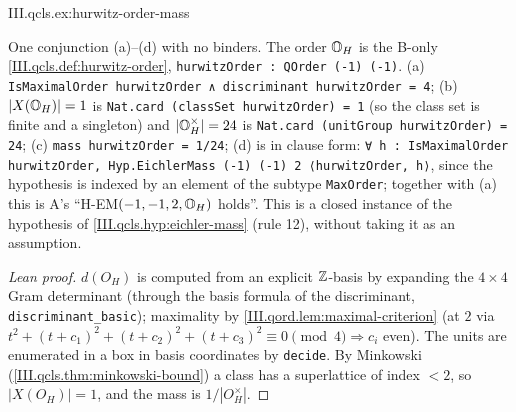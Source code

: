 \begin{example}
\end{example}
\begin{tfformal}{III.qcls.ex:hurwitz-order-mass}
\begin{tffidelity}
One conjunction (a)--(d) with no binders. The order $\mathbb{O}_H$ is the B-only \cref{III.qcls.def:hurwitz-order}, \texttt{hurwitzOrder : QOrder (-1) (-1)}. (a) \texttt{IsMaximalOrder hurwitzOrder ∧ discriminant hurwitzOrder = 4}; (b) $\lvert X(\mathbb{O}_H)\rvert=1$ is \texttt{Nat.card (classSet hurwitzOrder) = 1} (so the class set is finite and a singleton) and $\lvert\mathbb{O}_H^\times\rvert=24$ is \texttt{Nat.card (unitGroup hurwitzOrder) = 24}; (c) \texttt{mass hurwitzOrder = 1/24}; (d) is in clause form: \texttt{∀ h : IsMaximalOrder hurwitzOrder, Hyp.EichlerMass (-1) (-1) 2 ⟨hurwitzOrder, h⟩}, since the hypothesis is indexed by an element of the subtype \texttt{MaxOrder}; together with (a) this is A's ``H-EM$(-1,-1,2,\mathbb{O}_H)$ holds''. This is a closed instance of the hypothesis of \cref{III.qcls.hyp:eichler-mass} (rule 12), without taking it as an assumption.
\end{tffidelity}
\end{tfformal}
\begin{proof}[Lean proof]
$d(O_H)$ is computed from an explicit $\mathbb{Z}$-basis by expanding the $4\times4$ Gram determinant (through the basis formula of the discriminant, \texttt{discriminant\_basic}); maximality by \cref{III.qord.lem:maximal-criterion} (at $2$ via $t^2+(t+c_1)^2+(t+c_2)^2+(t+c_3)^2\equiv0\pmod 4\Rightarrow c_i$ even). The units are enumerated in a box in basis coordinates by \texttt{decide}. By Minkowski (\cref{III.qcls.thm:minkowski-bound}) a class has a superlattice of index $<2$, so $|X(O_H)|=1$, and the mass is $1/|O_H^\times|$.
\end{proof}

